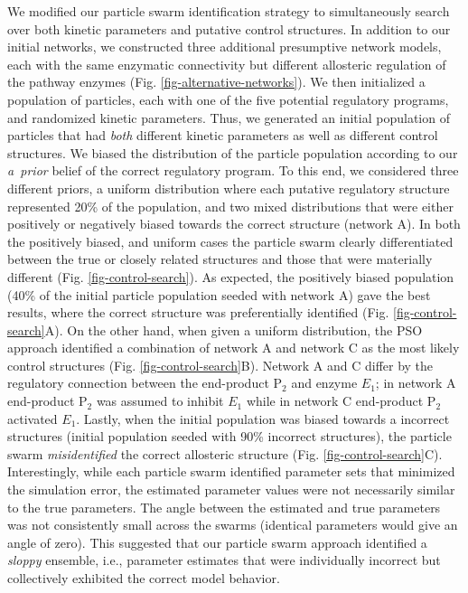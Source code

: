 \documentclass[12pt]{article}
\begin{document}
We modified our particle swarm identification strategy to simultaneously search over both kinetic parameters and putative control structures.
In addition to our initial networks, we constructed three additional presumptive network models, each with the same enzymatic connectivity but different allosteric 
regulation of the pathway enzymes (Fig. \ref{fig-alternative-networks}). 
We then initialized a population of particles, each with one of the five potential regulatory programs, and randomized kinetic parameters.
Thus, we generated an initial population of particles that had \textit{both} different kinetic parameters as well as different control structures. 
We biased the distribution of the particle population according to our \textit{a~prior} belief of the correct regulatory program.
To this end, we considered three different priors, a uniform distribution where each putative regulatory structure represented 20\% of the population, and
two mixed distributions that were either positively or negatively biased towards the correct structure (network A).
In both the positively biased, and uniform cases the particle swarm clearly differentiated between the true or closely related structures and those that were materially different (Fig. \ref{fig-control-search}).  As expected, the positively biased population (40\% of the initial particle population seeded with network A) gave the best results, where the correct structure was preferentially identified (Fig. \ref{fig-control-search}A). 
On the other hand, when given a uniform distribution, 
the PSO approach identified a combination of network A and network C as the most likely control structures (Fig. \ref{fig-control-search}B).
Network A and C differ by the regulatory connection between the end-product P$_2$ and enzyme $E_{1}$; in network A end-product P$_{2}$ was assumed to inhibit $E_{1}$ while in network C end-product P$_{2}$ activated $E_{1}$.  Lastly, when the initial population was biased towards a incorrect structures (initial population seeded with 90\% incorrect structures), 
the particle swarm \textit{misidentified} the correct allosteric structure (Fig. \ref{fig-control-search}C). 
Interestingly, while each particle swarm identified parameter sets that minimized the simulation error, the estimated parameter values were not necessarily similar to the true parameters. 
The angle between the estimated and true parameters was not consistently small across the swarms (identical parameters would give an angle of zero). 
This suggested that our particle swarm approach identified a \textit{sloppy} ensemble, i.e., 
parameter estimates that were individually incorrect but collectively exhibited the correct model behavior.  
\end{document}
